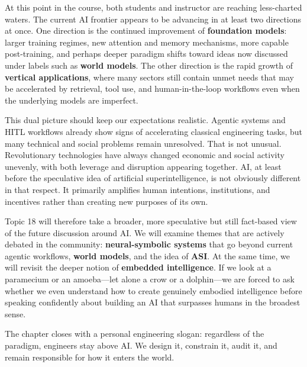 \documentclass[12pt]{article}
\begin{document}
At this point in the course, both students and instructor are reaching less-charted waters. The current AI frontier appears to be advancing in at least two directions at once. One direction is the continued improvement of \textbf{foundation models}: larger training regimes, new attention and memory mechanisms, more capable post-training, and perhaps deeper paradigm shifts toward ideas now discussed under labels such as \textbf{world models}. The other direction is the rapid growth of \textbf{vertical applications}, where many sectors still contain unmet needs that may be accelerated by retrieval, tool use, and human-in-the-loop workflows even when the underlying models are imperfect.

This dual picture should keep our expectations realistic. Agentic systems and HITL workflows already show signs of accelerating classical engineering tasks, but many technical and social problems remain unresolved. That is not unusual. Revolutionary technologies have always changed economic and social activity unevenly, with both leverage and disruption appearing together. AI, at least before the speculative idea of artificial superintelligence, is not obviously different in that respect. It primarily amplifies human intentions, institutions, and incentives rather than creating new purposes of its own.

Topic 18 will therefore take a broader, more speculative but still fact-based view of the future discussion around AI. We will examine themes that are actively debated in the community: \textbf{neural-symbolic systems} that go beyond current agentic workflows, \textbf{world models}, and the idea of \textbf{ASI}. At the same time, we will revisit the deeper notion of \textbf{embedded intelligence}. If we look at a paramecium or an amoeba---let alone a crow or a dolphin---we are forced to ask whether we even understand how to create genuinely embodied intelligence before speaking confidently about building an AI that surpasses humans in the broadest sense.

The chapter closes with a personal engineering slogan: regardless of the paradigm, engineers stay above AI. We design it, constrain it, audit it, and remain responsible for how it enters the world.
\end{document}
